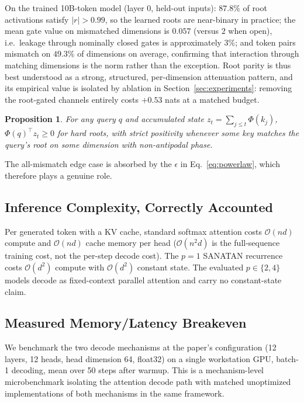 \documentclass{article}
\newcommand{\cO}{\mathcal{O}}
\newtheorem{proposition}[theorem]{Proposition}
\begin{document}
On the trained 10B-token model (layer 0, held-out inputs): $87.8\%$ of root activations satisfy $|r| > 0.99$, so the learned roots are near-binary in practice; the mean gate value on mismatched dimensions is $0.057$ (versus $2$ when open), i.e.\ leakage through nominally closed gates is approximately $3\%$; and token pairs mismatch on $49.3\%$ of dimensions on average, confirming that interaction through matching dimensions is the norm rather than the exception. Root parity is thus best understood as a strong, structured, per-dimension attenuation pattern, and its empirical value is isolated by ablation in Section~\ref{sec:experiments}: removing the root-gated channels entirely costs $+0.53$ nats at a matched budget.

\begin{proposition}
\label{prop:positivity}
For any query $q$ and accumulated state $z_t = \sum_{j \leq t}\Phi(k_j)$, $\Phi(q)^\top z_t \geq 0$ for hard roots, with strict positivity whenever some key matches the query's root on some dimension with non-antipodal phase.
\end{proposition}

The all-mismatch edge case is absorbed by the $\epsilon$ in Eq.~\ref{eq:powerlaw}, which therefore plays a genuine role.

\subsection{Inference Complexity, Correctly Accounted}

Per generated token with a KV cache, standard softmax attention costs $\cO(nd)$ compute and $\cO(nd)$ cache memory per head ($\cO(n^2 d)$ is the full-sequence training cost, not the per-step decode cost). The $p=1$ SANATAN recurrence costs $\cO(d^2)$ compute with $\cO(d^2)$ constant state. The evaluated $p \in \{2,4\}$ models decode as fixed-context parallel attention and carry no constant-state claim.

\subsection{Measured Memory/Latency Breakeven}
\label{sec:breakeven}

We benchmark the two decode mechanisms at the paper's configuration (12 layers, 12 heads, head dimension 64, float32) on a single workstation GPU, batch-1 decoding, mean over 50 steps after warmup. This is a mechanism-level microbenchmark isolating the attention decode path with matched unoptimized implementations of both mechanisms in the same framework.
\end{document}
